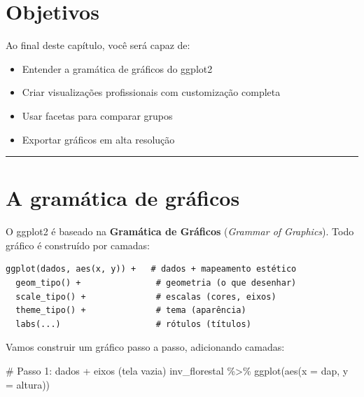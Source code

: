 \documentclass[
  letterpaper,
]{scrbook}
\newenvironment{Shaded}{\begin{snugshade}}{\end{snugshade}}
\newcommand{\AttributeTok}[1]{\textcolor[rgb]{0.40,0.45,0.13}{#1}}
\newcommand{\CommentTok}[1]{\textcolor[rgb]{0.37,0.37,0.37}{#1}}
\newcommand{\FunctionTok}[1]{\textcolor[rgb]{0.28,0.35,0.67}{#1}}
\newcommand{\NormalTok}[1]{\textcolor[rgb]{0.00,0.23,0.31}{#1}}
\newcommand{\SpecialCharTok}[1]{\textcolor[rgb]{0.37,0.37,0.37}{#1}}
\begin{document}
\section*{Objetivos}\label{objetivos-3}


Ao final deste capítulo, você será capaz de:

\begin{itemize}
\item
  Entender a gramática de gráficos do ggplot2
\item
  Criar visualizações profissionais com customização completa
\item
  Usar facetas para comparar grupos
\item
  Exportar gráficos em alta resolução
\end{itemize}

\begin{center}\rule{0.5\linewidth}{0.5pt}\end{center}

\section{A gramática de gráficos}\label{a-gramuxe1tica-de-gruxe1ficos}

O ggplot2 é baseado na \textbf{Gramática de Gráficos} (\emph{Grammar of
Graphics}). Todo gráfico é construído por camadas:

\begin{verbatim}
ggplot(dados, aes(x, y)) +   # dados + mapeamento estético
  geom_tipo() +               # geometria (o que desenhar)
  scale_tipo() +              # escalas (cores, eixos)
  theme_tipo() +              # tema (aparência)
  labs(...)                   # rótulos (títulos)
\end{verbatim}

Vamos construir um gráfico passo a passo, adicionando camadas:

\begin{Shaded}
\begin{Highlighting}[]
\CommentTok{\# Passo 1: dados + eixos (tela vazia)}
\NormalTok{inv\_florestal }\SpecialCharTok{\%\textgreater{}\%}
  \FunctionTok{ggplot}\NormalTok{(}\FunctionTok{aes}\NormalTok{(}\AttributeTok{x =}\NormalTok{ dap, }\AttributeTok{y =}\NormalTok{ altura))}
\end{Highlighting}
\end{Shaded}
\end{document}
